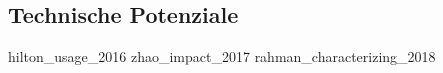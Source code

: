\subsection{Technische Potenziale}
\label{Technische Potenziale}

hilton_usage_2016
zhao_impact_2017
rahman_characterizing_2018